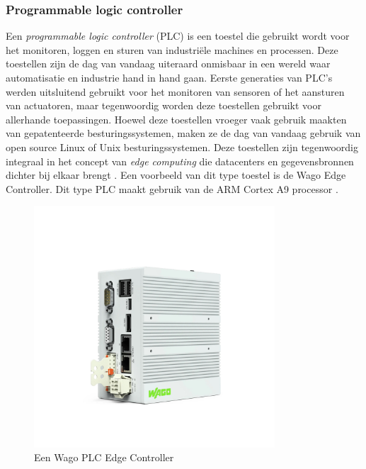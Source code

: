 \subsubsection{Programmable logic controller}
Een \textit{programmable logic controller} (PLC) is een toestel die gebruikt wordt voor het monitoren, loggen en sturen van industriële machines en processen. Deze toestellen zijn de dag van vandaag uiteraard onmisbaar in een wereld waar automatisatie en industrie hand in hand gaan. Eerste generaties van PLC’s werden uitsluitend gebruikt voor het monitoren van sensoren of het aansturen van actuatoren, maar tegenwoordig worden deze toestellen gebruikt voor allerhande toepassingen. Hoewel deze toestellen vroeger vaak gebruik maakten van gepatenteerde besturingssystemen, maken ze de dag van vandaag gebruik van open source Linux of Unix besturingssystemen. Deze toestellen zijn tegenwoordig integraal in het concept van \textit{edge computing} die datacenters en gegevensbronnen dichter bij elkaar brengt \autocite{DeCraeke2022}. Een voorbeeld van dit type toestel is de Wago Edge Controller. Dit type PLC maakt gebruik van de ARM Cortex A9 processor \autocite{Wago2022}.

\begin{figure}[!h]
	\centering
	\includegraphics[width=90mm, scale=0.5]{img/wago_edge_controller.jpg}
	\caption{Een Wago PLC Edge Controller \autocite{Wago2022}}
\end{figure}
